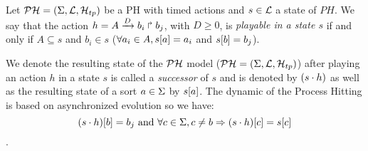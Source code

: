 \begin{definition} 
\label{def:playableAction}
Let $\mathcal{PH} = (\Sigma,\mathcal{L},\mathcal{H}_{tp})$ be a PH with timed actions and $s \in \mathcal{L}$ a state of $PH$.
We say that the action $h = A\xrightarrow{D} b_i \Rsh b_j$, with $D \geq 0 $,
is \emph{playable in a state $s$} if and only if
$A \subseteq s$ and $b_i \in s$ (\ie$ \forall a_i \in A, {s[a]} = a_i$ and ${s[b]}=b_j$).
\end{definition}

%
%
%
%
We denote the resulting state of the $\mathcal{PH}$ model ($\mathcal{PH} = (\Sigma,\mathcal{L},\mathcal{H}_{tp})$) after playing an action $h$ in a state $s$ is called a \emph{successor} of $s$ and is denoted by $(s \cdot h)$ as well as the resulting state of a sort $a \in \Sigma$ by ${s[a]}$. The dynamic of the Process Hitting is based on asynchronized evolution so we have: $${(s \cdot h)[b]} = b_j \text{ and } \forall c \in \Sigma, c \neq b \Rightarrow {(s \cdot h)[c]}={s[c]}$$.

